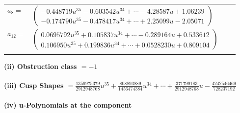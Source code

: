 \documentclass[1p]{elsarticle_modified}
\theoremstyle{definition}
\begin{document}
\begin{tabular}{m{7pt} m{180pt} m{7pt} m{180pt} }
\flushright $a_{8}=$&$\begin{pmatrix}-0.448719 u^{35}-0.603542 u^{34}+\cdots-4.28587 u+1.06239\\-0.174790 u^{35}-0.478417 u^{34}+\cdots+2.25099 u-2.05071\end{pmatrix}$ \\
\flushright $a_{12}=$&$\begin{pmatrix}0.0695792 u^{35}+0.105837 u^{34}+\cdots-0.289164 u+0.533612\\0.106950 u^{35}+0.199836 u^{34}+\cdots+0.0528230 u+0.809104\end{pmatrix}$\\&\end{tabular}
\flushleft \textbf{(ii) Obstruction class $= -1$}\\~\\
\flushleft \textbf{(iii) Cusp Shapes $= \frac{1359975379}{2912948768} u^{35}+\frac{808893889}{1456474384} u^{34}+\cdots+\frac{371799183}{2912948768} u-\frac{4242546469}{728237192}$}\\~\\
\newpage\renewcommand{\arraystretch}{1}
\flushleft \textbf{(iv) u-Polynomials at the component}\newline \\
\end{document}
